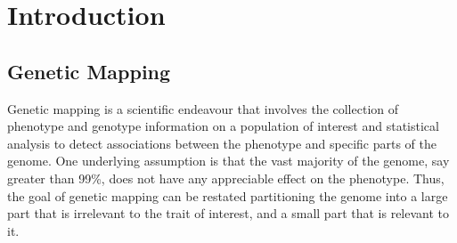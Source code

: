 \chapter{Introduction}

\section{Genetic Mapping}

Genetic mapping is a scientific endeavour that involves the collection of phenotype and genotype information on a population of interest and statistical analysis to detect associations between the phenotype and specific parts of the genome.
One underlying assumption is that the vast majority of the genome, say greater than 99\%, does not have any appreciable effect on the phenotype.
Thus, the goal of genetic mapping can be restated partitioning the genome into a large part that is irrelevant to the trait of interest, and a small part that is relevant to it.

